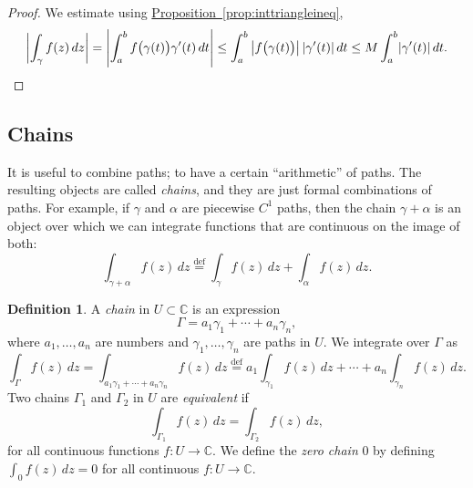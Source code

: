\documentclass[12pt,openany]{book}
\newcommand{\sabs}[1]{\lvert {#1} \rvert}
\newcommand{\abs}[1]{\left\lvert {#1} \right\rvert}
\newcommand{\C}{{\mathbb{C}}}
\newcommand{\myindex}[1]{#1\index{#1}}
\theoremstyle{plain}
\theoremstyle{remark}
\theoremstyle{definition}
\newtheorem{defn}[thm]{Definition}
\theoremstyle{exercise}
\theoremstyle{example}
\newcommand{\propref}[1]{\hyperref[#1]{Proposition~\ref*{#1}}}
\begin{document}
\begin{proof}
We estimate using \propref{prop:inttriangleineq},
\begin{equation*}
\abs{\int_\gamma f(z) \, dz}
=
\abs{\int_a^b f\bigl( \gamma(t) \bigr) \gamma'(t) \, dt}
\leq
\int_a^b \abs{ f\bigl( \gamma(t) \bigr) }  \sabs{ \gamma'(t) } \, dt
\leq
M
\int_a^b \sabs{ \gamma'(t) } \, dt .
\qedhere
\end{equation*}
\end{proof}

\subsection{Chains}

It is useful to combine paths; to have a certain ``arithmetic'' of paths.
The resulting objects are called \emph{chains}, and they
are just formal combinations of paths.  For example, if $\gamma$
and $\alpha$ are piecewise $C^1$ paths, then the chain  $\gamma+\alpha$
is an object over which we can integrate functions that are continuous
on the image of both:
\begin{equation*}
\int_{\gamma + \alpha} f(z) \, dz
\overset{\text{def}}{=}
\int_{\gamma} f(z) \, dz +
\int_{\alpha} f(z) \, dz .
\end{equation*}

\begin{defn}
A \emph{\myindex{chain}} in $U \subset \C$ is an expression
\begin{equation*}
\Gamma = a_1 \gamma_1 + \cdots + a_n \gamma_n ,
\end{equation*}
where $a_1,\ldots,a_n$ are numbers and $\gamma_1,\ldots,\gamma_n$
are paths in $U$.  We integrate over $\Gamma$ as
\begin{equation*}
\int_{\Gamma} f(z) \, dz
=
\int_{a_1 \gamma_1 + \cdots + a_n \gamma_n} f(z) \, dz
\overset{\text{def}}{=}
a_1 \int_{\gamma_1} f(z) \, dz +
\cdots
+
a_n \int_{\gamma_n} f(z) \, dz .
\end{equation*}
Two chains $\Gamma_1$ and $\Gamma_2$ in 
$U$ are
\emph{equivalent} if
\begin{equation*}
\int_{\Gamma_1} f(z) \, dz = 
\int_{\Gamma_2} f(z) \, dz ,
\end{equation*}
for all continuous functions $f \colon U \to \C$.
We define the \emph{\myindex{zero chain}} $0$ by defining 
$\int_0 f(z) \, dz = 0$ for all continuous $f \colon U \to \C$.
\end{defn}
\end{document}
